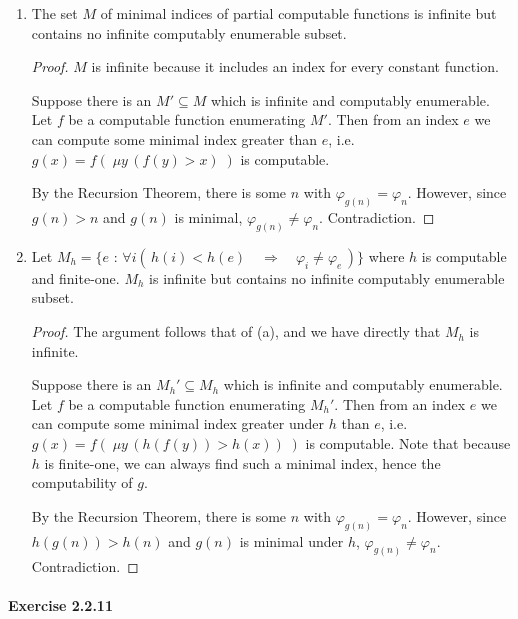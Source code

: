 \documentclass[a4paper,11pt]{article}
\begin{document}
\begin{enumerate}[label=(\alph*)]

\item
The set $M$ of minimal indices of partial computable functions
is infinite but contains no infinite computably enumerable subset.

\begin{proof}
$M$ is infinite because it includes an index for every constant function.

Suppose there is an $M' \subseteq M$ which is infinite and computably enumerable.
Let $f$ be a computable function enumerating $M'$.
Then from an index $e$ we can compute some minimal index greater than $e$, i.e.
$g(x) = f( \; \mu y \, (f(y) > x) \; )$ is computable.

By the Recursion Theorem, there is some $n$ with $\varphi_{g(n)} = \varphi_n$.
However, since $g(n) > n$ and $g(n)$ is minimal, $\varphi_{g(n)} \neq \varphi_n$.
Contradiction.
\end{proof}

\item
Let $M_h = \{ e \text{ : } \forall i ( \, h(i) < h(e) \quad \Rightarrow \quad \varphi_i \neq \varphi_e \, ) \}$
where $h$ is computable and finite-one.
$M_h$ is infinite but contains no infinite computably enumerable subset.

\begin{proof}
The argument follows that of (a), and we have directly that $M_h$ is infinite.

Suppose there is an $M_h' \subseteq M_h$ which is infinite and computably enumerable.
Let $f$ be a computable function enumerating $M_h'$.
Then from an index $e$ we can compute some minimal index greater under $h$ than $e$, i.e.
$g(x) = f( \; \mu y \, (h(f(y)) > h(x)) \; )$ is computable.
Note that because $h$ is finite-one, we can always find such a minimal index, hence the
computability of $g$.

By the Recursion Theorem, there is some $n$ with $\varphi_{g(n)} = \varphi_n$.
However, since $h(g(n)) > h(n)$ and $g(n)$ is minimal under $h$, $\varphi_{g(n)} \neq \varphi_n$.
Contradiction.
\end{proof}

\end{enumerate}


\paragraph{Exercise 2.2.11}
\end{document}
